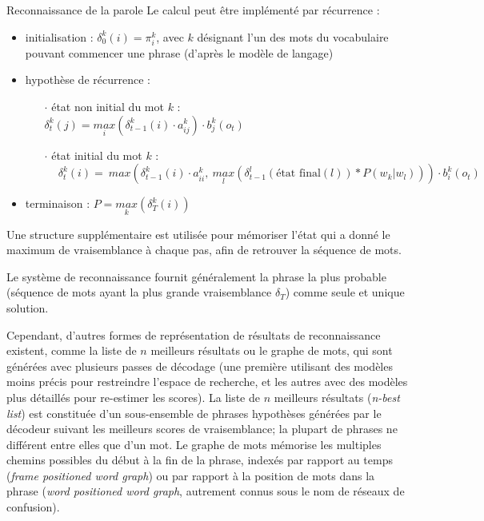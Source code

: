 \documentclass{style/these}
\begin{document}
\begin{part}{Reconnaissance de la parole}
Le calcul peut être implémenté par récurrence :
\begin{itemize}
\item initialisation : $\delta_{0}^{k}(i) = \pi_{i}^{k}$, avec $k$ désignant l'un des mots du vocabulaire pouvant commencer une phrase (d'après le modèle de langage)
\item hypothèse de récurrence : 	
	\begin{enumerate}
	\item[$\cdot$] état non initial du mot $k$ : \\
			$\delta_{t}^{k}(j) = \underset{i}{max} (\delta_{t-1}^{k}(i) \cdot a_{ij}^{k}) \cdot b_{j}^{k}(o_t)$		
	\item[$\cdot$] état initial du mot $k$ :	\\
			$\ \quad \delta_{t}^{k}(i) = \ max \left (\delta_{t-1}^{k}(i) \cdot a_{ii}^{k},\ \underset{l}{max} \left (\delta_{t-1}^{l}(\text{état final}(l)) * P(w_k|w_l) \right ) \right ) \cdot b_{i}^{k}(o_t)$
	\end{enumerate}	
\item terminaison : $P = \underset{k}{max} (\delta_T^{k}(i))$
\end{itemize}	

Une structure supplémentaire est utilisée pour mémoriser l'état qui a donné le maximum de vraisemblance à chaque pas, afin de retrouver la séquence de mots. 

Le système de reconnaissance fournit généralement la phrase la plus probable (séquence de mots ayant la plus grande vraisemblance $\delta_T$) comme seule et unique solution. 

Cependant, d'autres formes de représentation de résultats de reconnaissance existent, comme la liste de $n$ meilleurs résultats ou le graphe de mots, qui sont générées avec
 plusieurs passes de décodage (une première utilisant des modèles moins précis pour restreindre l'espace de recherche, et les autres avec des modèles plus détaillés pour re-estimer les scores).  
La liste de $n$ meilleurs résultats (\textit{n-best list}) est constituée d'un sous-ensemble de phrases hypothèses générées par le décodeur suivant les meilleurs scores de vraisemblance; la plupart de phrases ne différent entre elles que d'un mot. 
Le graphe de mots mémorise les multiples chemins possibles du début à la fin de la phrase, indexés par rapport au temps (\textit{frame positioned word graph}) ou par rapport à la position de mots dans la phrase  (\textit{word positioned word graph}, autrement connus sous le nom de réseaux de confusion).   


\end{part}
\end{document}
